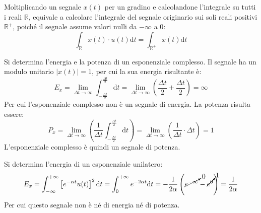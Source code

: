 \documentclass{article}
\newcommand{\df}{\mathrm{d}}
\numberwithin{equation}{subsection}
\begin{document}
Moltiplicando un segnale $x(t)$ per un gradino e calcolandone l'integrale su tutti i reali $\mathbb{R}$, equivale a calcolare l'integrale del segnale originario sui soli 
reali positivi $\mathbb{R}^+$, poiché il segnale assume valori nulli da $-\infty$ a $0$: 
\begin{equation*}
    \displaystyle\int_{\mathbb{R}}x(t)\cdot u(t)\df t=\int_{\mathbb{R}^+}x(t)\df t
\end{equation*}



Si determina l'energia e la potenza di un esponenziale complesso. Il segnale ha un modulo unitario $|x(t)|=1$, per cui la sua energia risultante è:
\begin{equation*}
    E_x=\lim_{\Delta t\to\infty}\displaystyle\int_{-\frac{\Delta t}{2}}^{\frac{\Delta t}{2}}\df t=\lim_{\Delta t\to\infty}\left(\frac{\Delta t}{2}+\frac{\Delta t}{2}\right)=\infty
\end{equation*}
Per cui l'esponenziale complesso non è un segnale di energia. La potenza risulta essere:
\begin{equation*}
    P_x=\lim_{\Delta t\to\infty}\displaystyle\left(\frac{1}{\Delta t}\int_{-\frac{\Delta t}{2}}^{\frac{\Delta t}{2}}\df t\right)=\lim_{\Delta t\to\infty}\left(\frac{1}{\Delta t}\cdot\Delta t\right)=1
\end{equation*}
L'esponenziale complesso è quindi un segnale di potenza. 



Si determina l'energia di un esponenziale unilatero:
\begin{equation*}
    E_x=\displaystyle\int_{-\infty}^{+\infty}\left[e^{-\alpha t}u(t)\right]^2\df t=\int_0^{+\infty}e^{-2\alpha t}\df t=-\frac{1}{2\alpha}\left(\cancelto{0}{e^{-\infty}}-\cancelto{1}{e^{0}}\right)=\frac{1}{2\alpha}
\end{equation*}
Per cui questo segnale non è né di energia né di potenza. 
\end{document}
